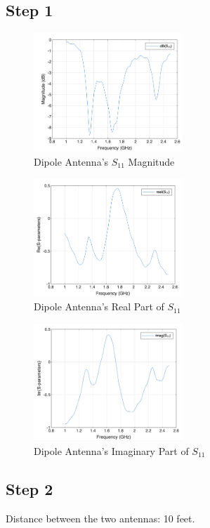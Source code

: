 \documentclass{article} %
\begin{document}
\subsection*{Step 1}
\begin{figure}[H]
    \centering
    \includegraphics[width=0.5\textwidth]{./image/figure10.png}
    \caption{Dipole Antenna's $S_{11}$ Magnitude}
\end{figure}
\begin{figure}[H]
    \centering
    \includegraphics[width=0.5\textwidth]{./image/figure11.png}
    \caption{Dipole Antenna's Real Part of $S_{11}$}
\end{figure}
\begin{figure}[H]
    \centering
    \includegraphics[width=0.5\textwidth]{./image/figure12.png}
    \caption{Dipole Antenna's Imaginary Part of $S_{11}$}
\end{figure}

\subsection*{Step 2}
Distance between the two antennas: 10 feet.
\end{document}
